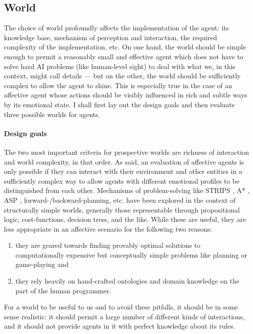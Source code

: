 \documentclass[]{scrartcl}
\theoremstyle{break}
\begin{document}
\subsection{World}

The choice of world profoundly affects the implementation of the agent: its knowledge base, mechanism of perception and interaction, the required complexity of the implementation, etc. On one hand, the world should be simple enough to permit a reasonably small and effective agent which does not have to solve hard AI problems (like human-level sight) to deal with what we, in this context, might call details --- but on the other, the world should be sufficiently complex to allow the agent to shine. This is especially true in the case of an affective agent whose actions should be visibly influenced in rich and subtle ways by its emotional state. I shall first lay out the design goals and then evaluate three possible worlds for agents.

\paragraph{Design goals} The two most important criteria for prospective worlds are richness of interaction and world complexity, in that order. As said, an evaluation of affective agents is only possible if they can interact with their environment and other entities in a sufficiently complex way to allow agents with different emotional profiles to be distinguished from each other. Mechanisms of problem-solving like STRIPS \cite{fikesNilsson}, A* \cite{nilssonAStar}, ASP \cite{lifschitz}, forward-/backward-planning, etc. have been explored in the context of structurally simple worlds, generally those representable through propositional logic, cost-functions, decision tress, and the like. While these are useful, they are less appropriate in an affective scenario for the following two reasons:

\begin{enumerate}
	\item they are geared towards finding provably optimal solutions to computationally expensive but conceptually simple problems like planning or game-playing and
	\item they rely heavily on hand-crafted ontologies and domain knowledge on the part of the human programmer.
\end{enumerate}

For a world to be useful to us and to avoid these pitfalls, it should be in some sense realistic: it should permit a large number of different kinds of interactions, and it should not provide agents in it with perfect knowledge about its rules. 
\end{document}
